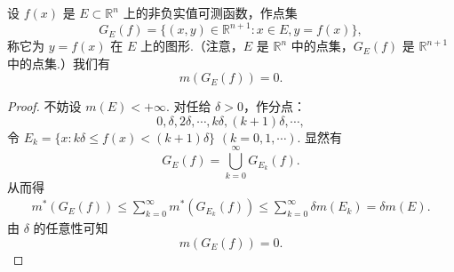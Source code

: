 \documentclass[../../main.tex]{subfiles}%
\begin{document}
\begin{corollary}[可测函数图形的测度]\label{corollary:可测函数图形的测度}
设 \( f(x) \) 是 \( E \subset \mathbb{R}^n \) 上的非负实值可测函数，作点集
\[
G_E(f) = \{ (x, y) \in \mathbb{R}^{n + 1} : x \in E, y = f(x) \},
\]
称它为 \( y = f(x) \) 在 \( E \) 上的图形.（注意，\( E \) 是 \( \mathbb{R}^n \) 中的点集，\( G_E(f) \) 是 \( \mathbb{R}^{n + 1} \) 中的点集.）我们有
\[
m(G_E(f)) = 0.
\]
\end{corollary}
\begin{proof}

不妨设 \( m(E) < +\infty \). 对任给 \( \delta > 0 \)，作分点：
\[
0, \delta, 2\delta, \cdots, k\delta, (k + 1)\delta, \cdots,
\]
令 \( E_k = \{ x : k\delta \leqslant f(x) < (k + 1)\delta \} \) \( (k = 0, 1, \cdots) \). 显然有
\[
G_E(f) = \bigcup_{k = 0}^{\infty} G_{E_k}(f).
\]
从而得
\begin{align*}
m^*(G_E(f)) \leqslant \sum_{k = 0}^{\infty} m^*(G_{E_k}(f)) \leqslant \sum_{k = 0}^{\infty} \delta m(E_k) = \delta m(E).
\end{align*}
由 \( \delta \) 的任意性可知
\[
m(G_E(f)) = 0.
\]

\end{proof}
\end{document}
